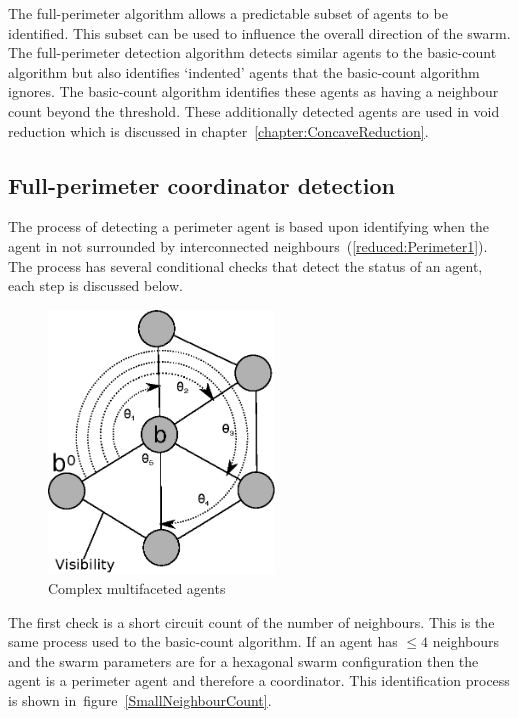 The full-perimeter algorithm allows a predictable subset of agents to be identified. This subset can be used to influence the overall direction of the swarm. The full-perimeter detection algorithm detects similar agents to the basic-count algorithm but also identifies `indented' agents that the basic-count algorithm ignores. The basic-count algorithm identifies these agents as having a neighbour count beyond the threshold. These additionally detected agents are used in void reduction which is discussed in chapter~\ref{chapter:ConcaveReduction}.

\subsection{Full-perimeter coordinator detection}\label{sec:PerimeterAgentDetection} 
The process of detecting a perimeter agent is based upon identifying when the agent in not surrounded by interconnected neighbours~(\autoref{reduced:Perimeter1}). The process has several conditional checks that detect the status of an agent, each step is discussed below. 

\begin{figure}[H]
\begin{center}
\includegraphics[width=6cm]{CHAPTER-6/figures/Perimeter1}
\end{center}
\caption{Complex multifaceted agents \label{reduced:Perimeter1}}
\end{figure}

The first check is a short circuit count of the number of neighbours. This is the same process used to the basic-count algorithm. If an agent has $\leq 4$ neighbours and the swarm parameters are for a hexagonal swarm configuration then the agent is a perimeter agent and therefore a coordinator. This identification process is shown in~figure~\ref{SmallNeighbourCount}. 

